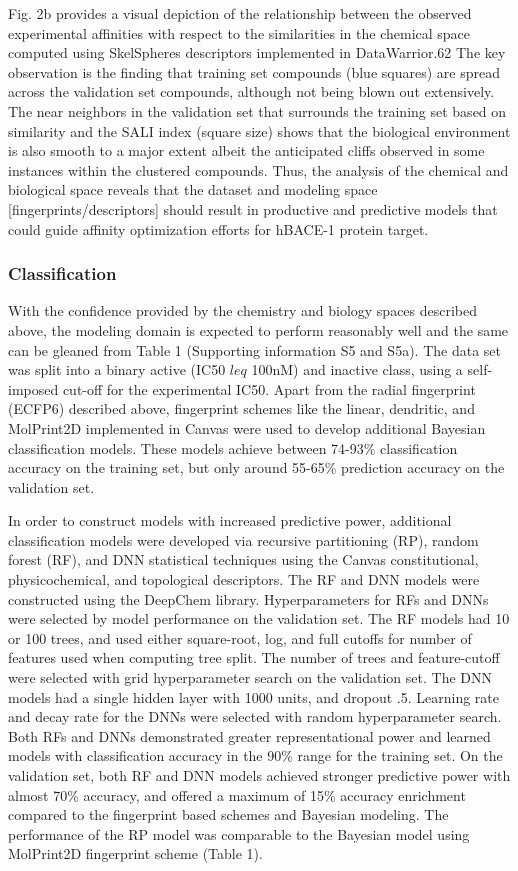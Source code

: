 Fig. 2b provides a visual depiction of the relationship between the observed experimental affinities with respect to the similarities in the chemical space computed using SkelSpheres descriptors implemented in DataWarrior.62  The key observation is the finding that training set compounds (blue squares) are spread across the validation set compounds, although not being blown out extensively.  The near neighbors in the validation set that surrounds the training set based on similarity and the SALI index (square size) shows that the biological environment is also smooth to a major extent albeit the anticipated cliffs observed in some instances within the clustered compounds.  
Thus, the analysis of the chemical and biological space reveals that the dataset and modeling space [fingerprints/descriptors] should result in productive and predictive models that could guide affinity optimization efforts for hBACE-1 protein target.


\subsubsection{Classification}

With the confidence provided by the chemistry and biology spaces described above, the modeling domain is expected to perform reasonably well and the same can be gleaned from Table 1 (Supporting information S5 and S5a).  The data set was split into a binary active (IC50 $leq$ 100nM) and inactive class, using a self-imposed cut-off for the experimental IC50.  Apart from the radial fingerprint (ECFP6) described above, fingerprint schemes like the linear, dendritic, and MolPrint2D implemented in Canvas were used to develop additional Bayesian classification models.  These models achieve between 74-93\% classification accuracy on the training set, but only around 55-65\% prediction accuracy on the validation set.  

In order to construct models with increased predictive power, additional classification models were developed via recursive partitioning (RP), random forest (RF), and DNN statistical techniques using the Canvas constitutional, physicochemical, and topological descriptors.  The RF and DNN models were constructed using the DeepChem library. Hyperparameters for RFs and DNNs were selected by model performance on the validation set. The RF models had 10 or 100 trees, and used either square-root, log, and full cutoffs for number of features used when computing tree split. The number of trees and feature-cutoff were selected with grid hyperparameter search on the validation set. The DNN models had a single hidden layer with 1000 units, and dropout .5. Learning rate and decay rate for the DNNs were selected with random hyperparameter search. Both RFs and DNNs demonstrated greater representational power and learned models with classification accuracy in the 90\% range for the training set.  On the validation set, both RF and DNN models achieved stronger predictive power with almost 70\% accuracy, and offered a maximum of 15\% accuracy enrichment compared to the fingerprint based schemes and Bayesian modeling.  The performance of the RP model was comparable to the Bayesian model using MolPrint2D fingerprint scheme (Table 1). 

